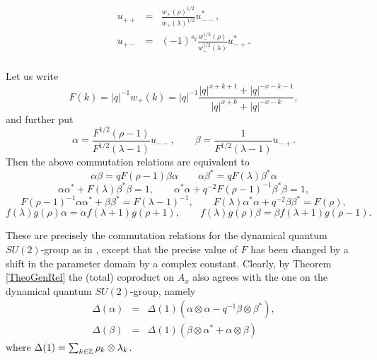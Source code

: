 

\begin{eqnarray*} u_{++} &=& \frac{w_+(\rho)^{1/2}}{w_+(\lambda)^{1/2}}u_{--}^*,\\u_{+-}&=& (-1)^{s_q}  \frac{w_-^{1/2}(\rho)}{w_+^{1/2}(\lambda)}u_{-+}^*.  \\ 
\end{eqnarray*}

Let us write \[F(k) = |q|^{-1}w_+(k) =  |q|^{-1}\frac{|q|^{x+k+1}+|q|^{-x-k-1}}{|q|^{x+k}+|q|^{-x-k}},\] and further put\[\alpha = \frac{F^{1/2}(\rho-1)}{F^{1/2}(\lambda-1)}u_{--},\qquad \beta = \frac{1}{F^{1/2}(\lambda-1)}u_{-+}.\] Then the above commutation relations are equivalent to \begin{equation}\label{EqqCom} \alpha \beta = qF(\rho-1)\beta\alpha \qquad \alpha\beta^* = qF(\lambda)\beta^*\alpha\end{equation} \begin{equation}\label{EqDet} \alpha\alpha^* +F(\lambda)\beta^*\beta = 1,\qquad \alpha^*\alpha+q^{-2}F(\rho-1)^{-1}\beta^*\beta = 1,\end{equation}\begin{equation*} F(\rho-1)^{-1}\alpha\alpha^* +\beta\beta^* = F(\lambda-1)^{-1},\qquad  F(\lambda)\alpha^*\alpha +q^{-2}\beta\beta^* = F(\rho),\end{equation*} \begin{equation}\label{EqGrad} f(\lambda)g(\rho)\alpha =
\alpha f(\lambda+1)g(\rho+1),\qquad f(\lambda)g(\rho)\beta = \beta f(\lambda+1)g(\rho-1).\end{equation}%

These are precisely the commutation relations for the dynamical quantum $SU(2)$-group as in \cite[Definition 2.6]{KoR1}, except that the precise value of $F$ has been changed by a shift in the parameter domain by a complex constant. Clearly, by Theorem \ref{TheoGenRel} the (total) coproduct on $A_x$ also agrees with the one on the dynamical quantum $SU(2)$-group, namely \begin{eqnarray*} \Delta(\alpha) &=& \Delta(1) (\alpha\otimes \alpha - q^{-1}\beta\otimes \beta^*),\\ \Delta(\beta) &=& \Delta(1)(\beta\otimes \alpha^* +\alpha\otimes \beta)\end{eqnarray*} where $\Delta(1) = \sum_{k\in \mathbb{Z}} \rho_k\otimes \lambda_k$.


